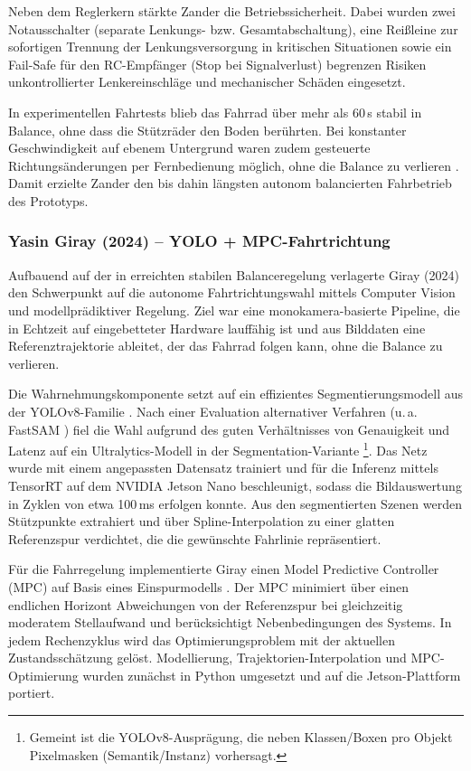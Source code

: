 Neben dem Reglerkern stärkte Zander die Betriebssicherheit. Dabei wurden zwei Notausschalter (separate Lenkungs- bzw. Gesamtabschaltung), 
eine Reißleine zur sofortigen Trennung der Lenkungsversorgung in kritischen Situationen sowie ein Fail-Safe 
für den RC-Empfänger (Stop bei Signalverlust) begrenzen Risiken unkontrollierter Lenkereinschläge und mechanischer Schäden eingesetzt\citep{zander2023}.

In experimentellen Fahrtests blieb das Fahrrad über mehr als 60\,s stabil in Balance, ohne dass die Stützräder 
den Boden berührten. Bei konstanter Geschwindigkeit auf ebenem 
Untergrund waren zudem gesteuerte Richtungsänderungen per Fernbedienung möglich, ohne die Balance zu verlieren 
\citep{zander2023}. Damit erzielte Zander den bis dahin längsten autonom balancierten Fahrbetrieb des Prototyps.


  
\subsubsection{Yasin Giray (2024) – YOLO + MPC-Fahrtrichtung}

Aufbauend auf der in \citep{zander2023} erreichten stabilen Balanceregelung verlagerte Giray (2024) \citep{vision_mpc_readme} 
den Schwerpunkt auf die autonome Fahrtrichtungswahl mittels Computer Vision und modellprädiktiver Regelung. Ziel war 
eine monokamera-basierte Pipeline, die in Echtzeit auf eingebetteter Hardware lauffähig ist und aus Bilddaten eine 
Referenztrajektorie ableitet, der das Fahrrad folgen kann, ohne die Balance zu verlieren.

Die Wahrnehmungskomponente setzt auf ein effizientes Segmentierungsmodell aus der YOLOv8-Familie \citep{Ultralytics2023}. 
Nach einer Evaluation alternativer Verfahren (u.\,a. FastSAM \citep{Zhao2023}) fiel die Wahl aufgrund des guten 
Verhältnisses von Genauigkeit und Latenz auf ein Ultralytics-Modell in der Segmentation-Variante
\footnote{Gemeint ist die YOLOv8-Ausprägung, die neben Klassen/Boxen pro Objekt Pixelmasken (Semantik/Instanz) 
vorhersagt.}. Das Netz wurde 
mit einem angepassten Datensatz trainiert und für die Inferenz mittels TensorRT auf dem NVIDIA Jetson Nano beschleunigt, 
sodass die Bildauswertung in Zyklen von etwa 100\,ms erfolgen konnte. Aus den segmentierten Szenen werden Stützpunkte 
extrahiert und über Spline-Interpolation zu einer glatten Referenzspur verdichtet, die die gewünschte Fahrlinie repräsentiert.

Für die Fahrregelung implementierte Giray einen Model Predictive Controller (MPC) auf Basis eines Einspurmodells 
\citep{Hunziker2019}. Der MPC minimiert über einen endlichen Horizont Abweichungen von der Referenzspur bei gleichzeitig 
moderatem Stellaufwand und berücksichtigt Nebenbedingungen des Systems. In jedem Rechenzyklus wird das Optimierungsproblem 
mit der aktuellen Zustandsschätzung gelöst. Modellierung, Trajektorien-Interpolation und MPC-Optimierung wurden 
zunächst in Python umgesetzt und auf die Jetson-Plattform portiert.

